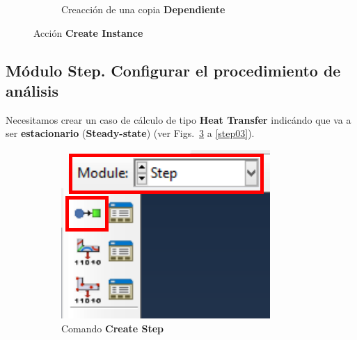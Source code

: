 \begin{figure}
\begin{subfigure}[!h]{0.39\textwidth}
      \caption{Creacción de una copia \textbf{Dependiente}}
      \label{asse02}
    \end{subfigure}%
    \caption{Acción \textbf{Create Instance}}
  \end{figure}

  \subsection{Módulo Step. Configurar el procedimiento de análisis}

  Necesitamos crear un caso de cálculo de tipo \textbf{Heat Transfer}
  indicándo que va a ser \textbf{estacionario} (\textbf{Steady-state})
  (ver Figs.~\ref{step01} a \ref{step03}).


  \begin{figure}
    \centering
    \begin{subfigure}[!h]{0.20\textwidth}
      \includegraphics[width=\textwidth]{./body/images/step01.pdf}
      \caption{Comando \textbf{Create Step}}
      \label{step01}
    \end{subfigure}%
    ~
    \begin{subfigure}[!h]{0.39\textwidth}

\end{subfigure}
\end{figure}
